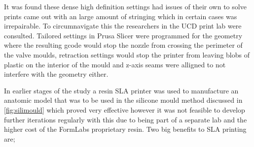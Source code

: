 It was found these dense high definition settings had issues of their own to solve prints came out with an large amount of stringing which in certain cases was irrepairable. To circumnavigate this the researchers in the UCD print lab  were consulted. Tailored settings in Prusa Slicer were programmed for the geometry where the resulting gcode would stop the nozzle from crossing the perimeter of the valve moulds, retraction settings would stop the printer from leaving blobs of plastic on the interior of the mould and z-axis seams were alligned to not interfere with the geometry either.

In earlier stages of the study a resin \gls{SLA} printer was used to manufacture an anatomic model that was to be used in the silicone mould method discussed in \cref{fig:silimould} which proved very effective however it was not feasible to develop further iterations regularly with this due to being part of a separate lab and the higher cost of the FormLabs proprietary resin. Two big benefits to \gls{SLA} printing are;


